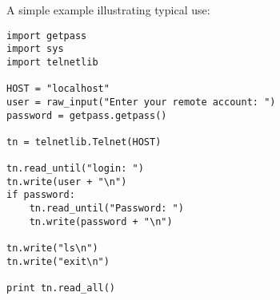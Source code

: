 A simple example illustrating typical use:

\begin{verbatim}
import getpass
import sys
import telnetlib

HOST = "localhost"
user = raw_input("Enter your remote account: ")
password = getpass.getpass()

tn = telnetlib.Telnet(HOST)

tn.read_until("login: ")
tn.write(user + "\n")
if password:
    tn.read_until("Password: ")
    tn.write(password + "\n")

tn.write("ls\n")
tn.write("exit\n")

print tn.read_all()
\end{verbatim}
